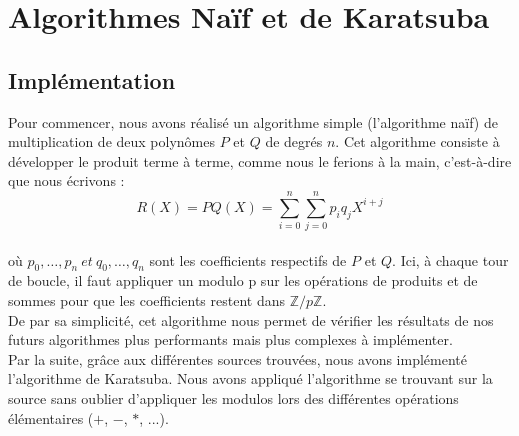 \documentclass[12pt, a4paper]{article}
\begin{document}
\newpage

\section{Algorithmes Naïf et de Karatsuba}
\subsection{Implémentation}

Pour commencer, nous avons réalisé un algorithme simple (l'algorithme naïf) de multiplication de deux polynômes $P$ et $Q$ de degrés $n$. Cet algorithme consiste à développer le produit terme à terme, comme nous le ferions à la main, c'est-à-dire que nous écrivons : \\
\[R(X) = PQ(X) =
\displaystyle\sum_{i=0}^{n}\sum_{j=0}^{n} p_i q_j X^{i+j}\] \\
où $p_0,\dots,p_n\ et\ q_0,\dots,q_n$ sont les coefficients respectifs de $P$ et $Q$. Ici, à chaque tour de boucle, il faut appliquer un modulo p sur les opérations de produits et de sommes pour que les coefficients restent dans $\mathbb{Z}/p\mathbb{Z}$.\\
De par sa simplicité, cet algorithme nous permet de vérifier les résultats de nos futurs algorithmes plus performants mais plus complexes à implémenter.\\
\indent Par la suite, grâce aux différentes sources 
trouvées, nous avons implémenté l'algorithme de Karatsuba. Nous avons appliqué l'algorithme se trouvant sur la source \cite{Karatsuba} sans oublier d'appliquer les modulos lors des différentes opérations élémentaires ($+$, $-$, $*$, ...).
\end{document}
